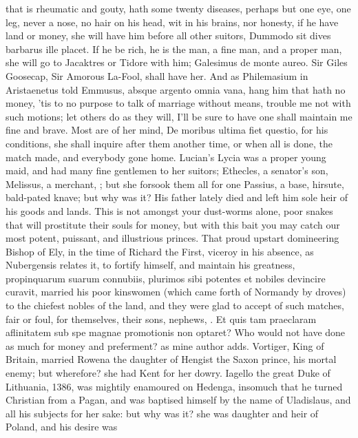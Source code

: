 {that is rheumatic and gouty, hath some twenty diseases, perhaps but one
eye, one leg, never a nose, no hair on his head, wit in his brains, nor
honesty, if he have land or money, she will have him before all
other suitors, Dummodo sit dives barbarus ille placet. If he be
rich, he is the man, a fine man, and a proper man, she will go to
Jacaktres or Tidore with him; Galesimus de monte aureo. Sir Giles
Goosecap, Sir Amorous La-Fool, shall have her. And as Philemasium in
 Aristaenetus told Emmusus, absque argento omnia vana, hang him
that hath no money, 'tis to no purpose to talk of marriage without
means,  trouble me not with such motions; let others do as they
will, I'll be sure to have one shall maintain me fine and brave. Most
are of her mind,  De moribus ultima fiet questio, for his
conditions, she shall inquire after them another time, or when all is
done, the match made, and everybody gone home. Lucian's Lycia was
a proper young maid, and had many fine gentlemen to her suitors;
Ethecles, a senator's son, Melissus, a merchant, \etc{}; but she forsook
them all for one Passius, a base, hirsute, bald-pated knave; but why
was it? His father lately died and left him sole heir of his goods and
lands. This is not amongst your dust-worms alone, poor snakes that will
prostitute their souls for money, but with this bait you may catch our
most potent, puissant, and illustrious princes. That proud upstart
domineering Bishop of Ely, in the time of Richard the First, viceroy in
his absence, as Nubergensis relates it, to fortify himself, and
maintain his greatness, propinquarum suarum connubiis, plurimos sibi
potentes et nobiles devincire curavit, married his poor kinswomen
(which came forth of Normandy by droves) to the chiefest nobles of the
land, and they were glad to accept of such matches, fair or foul, for
themselves, their sons, nephews, \etc{}. Et quis tam praeclaram aflinitatem
sub spe magnae promotionis non optaret? Who would not have done as much
for money and preferment? as mine author adds. Vortiger, King of
Britain, married Rowena the daughter of Hengist the Saxon prince, his
mortal enemy; but wherefore? she had Kent for her dowry. Iagello the
great Duke of Lithuania, 1386, was mightily enamoured on Hedenga,
insomuch that he turned Christian from a Pagan, and was baptised
himself by the name of Uladislaus, and all his subjects for her sake:
but why was it? she was daughter and heir of Poland, and his desire was
}
